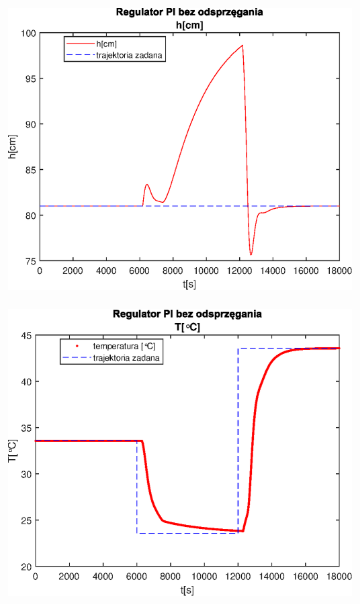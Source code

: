 \begin{figure}[h!]
   \centering
   \begin{subfigure}[b]{0.4\textwidth}
      \includegraphics[width=1\linewidth]{img/PI/noDecoupler/noDisturbance/PINoDecouplerH3Lintrue.eps}
      \caption{}
      \label{fig:fig:PINodDecoupler3Lintrue1}
   \end{subfigure}
       
   \begin{subfigure}[b]{0.4\textwidth}
      \includegraphics[width=1\linewidth]{img/PI/noDecoupler/noDisturbance/PINoDecouplerT3Lintrue.eps}
      \caption{}
      \label{fig:fig:PINodDecoupler3Lintrue2}
   \end{subfigure}
       

\end{figure}
